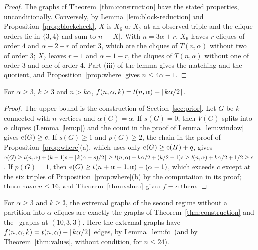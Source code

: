 \begin{proof}
The graphs of Theorem~\ref{thm:construction} have the stated properties, unconditionally. Conversely, by
Lemma~\ref{lem:block-reduction} and Proposition~\ref{prop:blockcheck}, $X$ is $X_6$ or $X_7$ at an observed triple and
the clique orders lie in $\{3,4\}$ and sum to $n-|X|$. With $n=3\alpha+r$, $X_6$ leaves $r$ cliques of order $4$ and
$\alpha-2-r$ of order $3$, which are the cliques of $T(n,\alpha)$ without two of order $3$; $X_7$ leaves $r-1$ and
$\alpha-1-r$, the cliques of $T(n,\alpha)$ without one of order $3$ and one of order $4$. Part (iii) of the lemma gives the matching and the quotient, and Proposition~\ref{prop:where} gives $n\le4\alpha-1$.
\end{proof}

\begin{lemma}\label{lem:fc}
For $\alpha\ge3$, $k\ge3$ and $n>k\alpha$, $f(n,\alpha,k)=t(n,\alpha)+\left\lceil k\alpha/2\right\rceil$.
\end{lemma}

\begin{proof}
The upper bound is the construction of Section~\ref{sec:prior}. Let $G$ be $k$-connected with $n$ vertices and
$\alpha(G)=\alpha$. If $s(G)=0$, then $V(G)$ splits into $\alpha$ cliques (Lemma~\ref{lem:p}) and the count in the proof
of Lemma~\ref{lem:window} gives $\mathrm{e}(G)\ge c$. If $s(G)\ge1$ and $p(G)\ge2$, the chain in the proof of
Proposition~\ref{prop:where}(a), which uses only $\mathrm{e}(G)\ge\mathrm{e}(H)+q$, gives
$\mathrm{e}(G)\ge t(n,\alpha)+(k-1)s+\left\lceil k(\alpha-s)/2\right\rceil\ge t(n,\alpha)+k\alpha/2+(k/2-1)s\ge t(n,\alpha)+k\alpha/2+1/2\ge c$.
If $p(G)=1$, then $\mathrm{e}(G)\ge t(n+\alpha-1,\alpha)-(\alpha-1)$, which exceeds $c$ except at the six triples of
Proposition~\ref{prop:where}(b) by the computation in its proof; those have $n\le16$, and Theorem~\ref{thm:values}
gives $f=c$ there.
\end{proof}

\begin{corollary}\label{cor:characterise}
For $\alpha\ge3$ and $k\ge3$, the extremal graphs of the second regime without a partition into $\alpha$ cliques are
exactly the graphs of Theorem~\ref{thm:construction} and the \ntenthreeb\ graphs at $(10,3,3)$. Here the extremal graphs
have $f(n,\alpha,k)=t(n,\alpha)+\left\lceil k\alpha/2\right\rceil$ edges, by Lemma~\ref{lem:fc} (and by Theorem~\ref{thm:values},
without condition, for $n\le24$).
\end{corollary}

